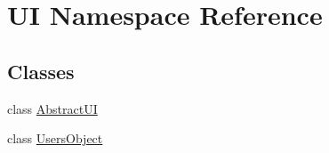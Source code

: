 \hypertarget{namespaceUI}{
\section{UI Namespace Reference}
\label{d6/d56/namespaceUI}
}
\subsection*{Classes}
\begin{DoxyCompactItemize}
\item 
class \hyperlink{classUI_1_1AbstractUI}{AbstractUI}
\item 
class \hyperlink{classUI_1_1UsersObject}{UsersObject}
\end{DoxyCompactItemize}
